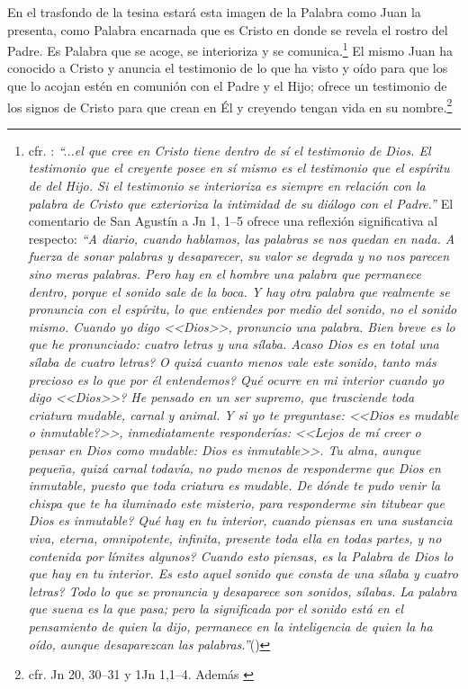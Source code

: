 \documentclass[12pt]{article}
\begin{document}
{En el trasfondo de la tesina estará esta imagen de la Palabra como Juan la presenta, como Palabra encarnada que es Cristo en donde se revela el rostro del Padre. Es Palabra que se acoge, se interioriza y se comunica.\footnote{
cfr. \cite[p.~1530]{dicctf}: \emph{``...el que cree en Cristo tiene dentro de sí el testimonio de Dios. El testimonio que el creyente posee en sí mismo es el testimonio que el espíritu de del Hijo. Si el testimonio se interioriza es siempre en relación con la palabra de Cristo que exterioriza la intimidad de su diálogo con el Padre.''} El comentario de San Agustín a Jn 1, 1--5 ofrece una reflexión significativa al respecto:
\emph{``A diario, cuando hablamos, las palabras se nos quedan en nada. A fuerza de sonar palabras y desaparecer, su valor se degrada y no nos parecen sino meras palabras. Pero hay en el hombre una palabra que permanece dentro, porque el sonido sale de la boca. Y hay otra palabra que realmente se pronuncia con el espíritu, lo que entiendes por medio del sonido, no el sonido mismo. Cuando yo digo <<Dios>>, pronuncio una palabra. Bien breve es lo que he pronunciado: cuatro letras y una sílaba. \textquestiondown Acaso Dios es en total una sílaba de cuatro letras? \textquestiondown O quizá cuanto menos vale este sonido, tanto más precioso es lo que por él entendemos? \textquestiondown Qué ocurre en mi interior cuando yo digo <<Dios>>? He pensado en un ser supremo, que trasciende toda criatura mudable, carnal y animal. Y si yo te preguntase: <<\textquestiondown Dios es mudable o inmutable?>>, inmediatamente responderías: <<Lejos de mí creer o pensar en Dios como mudable: Dios es inmutable>>. Tu alma, aunque pequeña, quizá carnal todavía, no pudo menos de responderme que Dios en inmutable, puesto que toda criatura es mudable. \textquestiondown De dónde te pudo venir la chispa que te ha iluminado este misterio, para responderme sin titubear que Dios es inmutable? \textquestiondown Qué hay en tu interior, cuando piensas en una sustancia viva, eterna, omnipotente, infinita, presente toda ella en todas partes, y no contenida por límites algunos? Cuando esto piensas, es la Palabra de Dios lo que hay en tu interior. \textquestiondown Es esto aquel sonido que consta de una sílaba y cuatro letras? Todo lo que se pronuncia y desaparece son sonidos, sílabas. La palabra que suena es la que pasa; pero la significada por el sonido está en el pensamiento de quien la dijo, permanece en la inteligencia de quien la ha oído, aunque desaparezcan las palabras.''}(\cite[n.~8]{aguscomentjn})
}
El mismo Juan ha conocido a Cristo y anuncia el testimonio de lo que ha visto y oído para que los que lo acojan estén en comunión con el Padre y el Hijo; ofrece un testimonio de los signos de Cristo para que crean en Él y creyendo tengan vida en su nombre.\footnote{cfr. Jn 20, 30--31 y 1Jn 1,1--4. Además \cite[1530]{dicctf}} 

}
\end{document}
